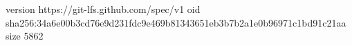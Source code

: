 version https://git-lfs.github.com/spec/v1
oid sha256:34a6e00b3cd76e9d231fdc9e469b81343651eb3b7b2a1e0b96971c1bd91c21aa
size 5862
